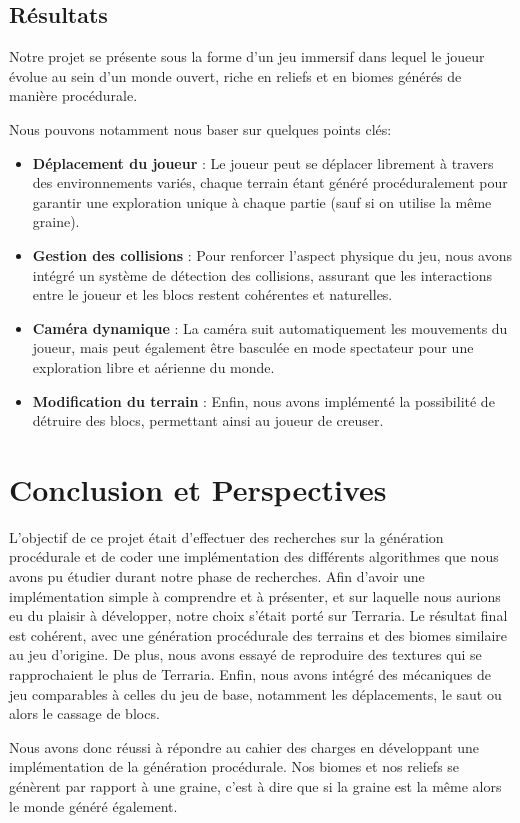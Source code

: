 \documentclass[12pt]{article}
\begin{document}
\subsection{Résultats}
Notre projet se présente sous la forme d’un jeu immersif dans lequel le joueur évolue au sein d’un monde ouvert, riche en reliefs et en biomes générés de manière procédurale.
\par
\vspace{0.3cm}
Nous pouvons notamment nous baser sur quelques points clés:\par
\vspace{0.3cm}
\begin{itemize}[label=\textbullet]
  \item 	\textbf{Déplacement du joueur} : Le joueur peut se déplacer librement à travers des environnements variés, chaque terrain étant généré procéduralement pour garantir une exploration unique à chaque partie (sauf si on utilise la même graine).
  \item \textbf{Gestion des collisions} : Pour renforcer l’aspect physique du jeu, nous avons intégré un système de détection des collisions, assurant que les interactions entre le joueur et les blocs restent cohérentes et naturelles.
  \item \textbf{Caméra dynamique} : La caméra suit automatiquement les mouvements du joueur, mais peut également être basculée en mode spectateur pour une exploration libre et aérienne du monde.
  \item \textbf{Modification du terrain} : Enfin, nous avons implémenté la possibilité de détruire des blocs, permettant ainsi au joueur de creuser.
\end{itemize}


\newpage
{}
\section{Conclusion et Perspectives}

L'objectif de ce projet était d'effectuer des recherches sur la génération procédurale et de coder une implémentation des différents algorithmes que nous avons pu étudier durant notre phase de recherches. Afin d'avoir une implémentation simple à comprendre et à présenter, et sur laquelle nous aurions eu du plaisir à développer, notre choix s'était porté sur Terraria. Le résultat final est cohérent, avec une génération procédurale des terrains et des biomes similaire au jeu d'origine. De plus, nous avons essayé de reproduire des textures qui se rapprochaient le plus de Terraria. Enfin, nous avons intégré des mécaniques de jeu comparables à celles du jeu de base, notamment les déplacements, le saut ou alors le cassage de blocs.\par
Nous avons donc réussi à répondre au cahier des charges en développant une implémentation de la génération procédurale. Nos biomes et nos reliefs se génèrent par rapport à une graine, c'est à dire que si la graine est la même alors le monde généré également. 
\end{document}
